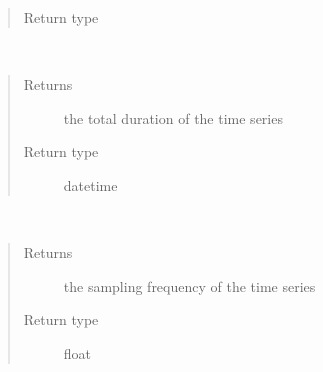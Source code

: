 \documentclass[letterpaper,10pt,english]{sphinxmanual}
\begin{document}
\begin{fulllineitems}
\begin{fulllineitems}
\begin{quote}
\begin{description}
\item[{Return type}] \leavevmode
{\hyperref[pyrem.time_series:pyrem.time_series.BiologicalTimeSeries]{}}

\end{description}\end{quote}

\end{fulllineitems}


\begin{fulllineitems}
\label{pyrem.time_series:pyrem.time_series.BiologicalTimeSeries.duration}~\begin{quote}\begin{description}
\item[{Returns}] \leavevmode
the total duration of the time series

\item[{Return type}] \leavevmode
datetime

\end{description}\end{quote}

\end{fulllineitems}


\begin{fulllineitems}
\label{pyrem.time_series:pyrem.time_series.BiologicalTimeSeries.fs}~\begin{quote}\begin{description}
\item[{Returns}] \leavevmode
the sampling frequency of the time series

\item[{Return type}] \leavevmode
float

\end{description}\end{quote}

\end{fulllineitems}



\end{fulllineitems}
\end{document}
